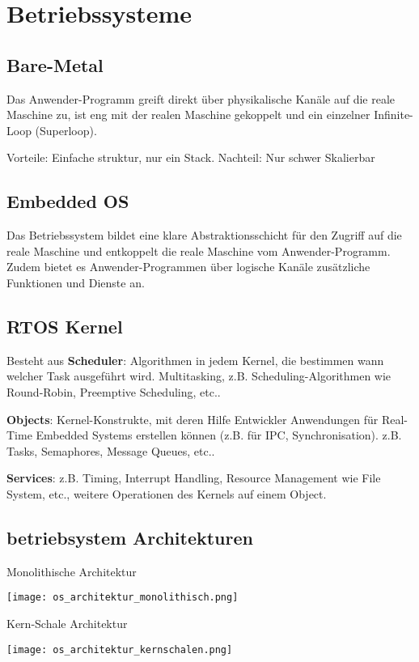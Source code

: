 \section{Betriebssysteme}
\subsection{Bare-Metal}
Das Anwender-Programm greift direkt über physikalische Kanäle auf die reale Maschine zu, ist eng mit der realen Maschine gekoppelt und ein einzelner Infinite-Loop (Superloop).

Vorteile: Einfache struktur, nur ein Stack.
Nachteil: Nur schwer Skalierbar

\subsection{Embedded OS}
Das Betriebssystem bildet eine klare Abstraktionsschicht für den Zugriff auf die reale Maschine und entkoppelt die reale Maschine vom Anwender-Programm. Zudem bietet es Anwender-Programmen über logische Kanäle zusätzliche Funktionen und Dienste an.

\subsection{RTOS Kernel}

Besteht aus \textbf{Scheduler}: Algorithmen in jedem Kernel, die bestimmen wann welcher Task ausgeführt wird. Multitasking, z.B. Scheduling-Algorithmen wie Round-Robin, Preemptive Scheduling, etc..

\textbf{Objects}: Kernel-Konstrukte, mit deren Hilfe Entwickler Anwendungen für Real-Time Embedded Systems
erstellen können (z.B. für IPC, Synchronisation). z.B. Tasks, Semaphores, Message Queues, etc..

\textbf{Services}: z.B. Timing, Interrupt Handling, Resource Management wie File System, etc., weitere Operationen des Kernels auf einem Object.

\subsection{betriebsystem Architekturen}

\begin{minipage}[t]{.45\linewidth}
	\centering
	Monolithische Architektur

	\texttt{[image: os\_architektur\_monolithisch.png]}
\end{minipage}\hfill
\begin{minipage}[t]{.45\linewidth}
	\centering
	Kern-Schale Architektur

	\texttt{[image: os\_architektur\_kernschalen.png]}
\end{minipage}

